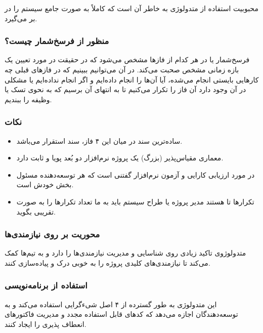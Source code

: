 محبوبیت استفاده از متدولوژی  به خاطر آن است که کاملاً به صورت جامع سیستم
را در بر می‌گیرد.

\subsubsection{منظور از فرسخ‌شمار چیست؟}

فرسخ‌شمار یا  در هر کدام از فاز‌ها مشخص می‌شود که در حقیقت در مورد
تعیین یک بازه زمانی مشخص صحبت می‌کند. در آن می‌توانیم ببینیم که در فاز‌های قبلی
چه کار‌هایی بایستی انجام می‌شده، آیا آن‌ها را انجام داده‌ایم و اگر انجام
نداده‌ایم یا مشکلی در آن وجود دارد آن فاز را تکرار می‌کنیم تا به انتهای آن برسیم
که به نحوی تسک یا وظیفه را ببندیم.

\subsubsection*{نکات}

\begin{itemize}
    \item ساده‌ترین سند در میان این ۴ فاز، سند استقرار می‌باشد.
    \item معماری مقیاس‌پذیر (بزرگ) یک پروژه نرم‌افزار دو بُعد پویا و ثابت دارد.
    \item در مورد ارزیابی کارایی و آزمون نرم‌افزار گفتنی است که هر توسعه‌دهنده
    مسئول  بخش خودش است.
    \item تکرار‌ها  تا هستند مدیر پروژه یا طراح سیستم باید به ما تعداد
    تکرار‌ها را به صورت تقریبی بگوید.
\end{itemize}

\subsubsection{محوریت بر روی نیازمندی‌ها}

متدولوژوی  تاکید زیادی روی شناسایی و مدیریت نیازمندی‌ها را دارد و به
تیم‌ها کمک می‌‌کند تا نیازمندی‌های کلیدی پروژه‌ را به خوبی درک و پیاده‌سازی
کنند.

\subsubsection{استفاده از برنامه‌نویسی }

این متدولوژی به طور گسترده از ۴ اصل شیء‌گرایی استفاده می‌کند و به توسعه‌دهندگان
اجازه می‌دهد که کد‌های قابل استفاده مجدد و مدیریت فاکتور‌های انعطاف پذیری را
ایجاد کنند.